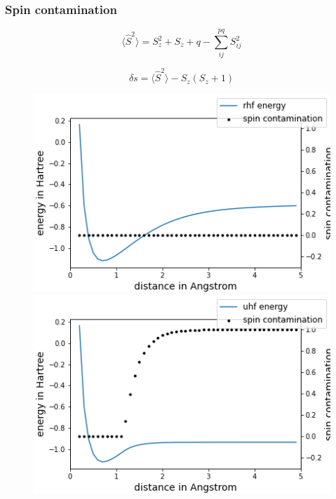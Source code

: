 \documentclass[aspectratio=169]{beamer}
\begin{document}
\begin{frame}
    \frametitle{Spin contamination}
    \begin{equation}
        \langle \hat{S}^2 \rangle = S_z^2 + S_z + q - \sum_{ij}^{pq}S_{ij}^2
    \end{equation}

    \begin{equation}
        \delta s = \langle \hat{S}^2 \rangle - S_z(S_z + 1)
    \end{equation}
    
\begin{figure}
    \begin{minipage}[b]{0.45\linewidth}
        \includegraphics[width=\linewidth]{./figures/rhf.png}
    \end{minipage}
    \begin{minipage}[b]{0.45\linewidth}
        \includegraphics[width=\linewidth]{./figures/uhf.png}
    \end{minipage}
\end{figure}

\end{frame}
\end{document}

